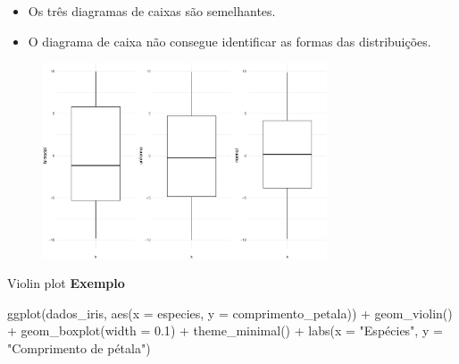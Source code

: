\documentclass[
  10pt,
  ignorenonframetext,
]{beamer}
\newenvironment{Shaded}{\begin{snugshade}}{\end{snugshade}}
\newcommand{\AttributeTok}[1]{\textcolor[rgb]{0.40,0.45,0.13}{#1}}
\newcommand{\FloatTok}[1]{\textcolor[rgb]{0.68,0.00,0.00}{#1}}
\newcommand{\FunctionTok}[1]{\textcolor[rgb]{0.28,0.35,0.67}{#1}}
\newcommand{\NormalTok}[1]{\textcolor[rgb]{0.00,0.23,0.31}{#1}}
\newcommand{\SpecialCharTok}[1]{\textcolor[rgb]{0.37,0.37,0.37}{#1}}
\newcommand{\StringTok}[1]{\textcolor[rgb]{0.13,0.47,0.30}{#1}}
\providecommand{\tightlist}{%
  \setlength{\itemsep}{0pt}\setlength{\parskip}{0pt}}\usepackage{longtable,booktabs,array}
\begin{document}
\begin{frame}
\begin{itemize}
\tightlist
\item
  Os três diagramas de caixas são semelhantes.
\item
  O diagrama de caixa não consegue identificar as formas das
  distribuições.
\end{itemize}

\begin{figure}

{\centering \includegraphics[width=0.75\textwidth,height=\textheight]{exploracao-visualizacao_files/figure-beamer/unnamed-chunk-112-1.pdf}

}

\end{figure}
\end{frame}

\begin{frame}[fragile]{Violin plot}
\protect\hypertarget{violin-plot-3}{}
\textbf{Exemplo}

\begin{Shaded}
\begin{Highlighting}[]
\FunctionTok{ggplot}\NormalTok{(dados\_iris, }\FunctionTok{aes}\NormalTok{(}\AttributeTok{x =}\NormalTok{ especies, }\AttributeTok{y =}\NormalTok{ comprimento\_petala)) }\SpecialCharTok{+}
  \FunctionTok{geom\_violin}\NormalTok{() }\SpecialCharTok{+} 
  \FunctionTok{geom\_boxplot}\NormalTok{(}\AttributeTok{width =} \FloatTok{0.1}\NormalTok{) }\SpecialCharTok{+}
  \FunctionTok{theme\_minimal}\NormalTok{() }\SpecialCharTok{+}
  \FunctionTok{labs}\NormalTok{(}\AttributeTok{x =} \StringTok{"Espécies"}\NormalTok{, }\AttributeTok{y =} \StringTok{"Comprimento de pétala"}\NormalTok{)}
\end{Highlighting}
\end{Shaded}
\end{frame}
\end{document}
